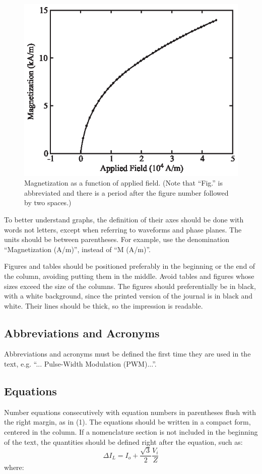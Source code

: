 \documentclass[english]{cobep-spec}
\begin{document}
\begin{figure}[!t]
	\includegraphics[scale=1]{Figs/figure.eps}
	\centering
	\caption{Magnetization as a function of applied field. (Note that ``Fig.'' is abbreviated and there is a period after the figure number followed by two spaces.)}
	\label{fig:fig1}
\end{figure}

To better understand graphs, the definition of their axes should be done with words not letters, except when referring to waveforms and phase planes. The units should be between parentheses. For example, use the denomination ``Magnetization (A/m)'', instead of ``M (A/m)''.

Figures and tables should be positioned preferably in the beginning or the end of the column, avoiding putting them in the middle. Avoid tables and figures whose sizes exceed the size of the columns. The figures should preferentially be in black, with a white background, since the printed version of the journal is in black and white. Their lines should be thick, so the impression is readable.

\subsection{Abbreviations and Acronyms}
Abbreviations and acronyms must be defined the first time they are used in the text, e.g. ``... Pulse-Width Modulation (PWM)...''.

\subsection{Equations}
Number equations consecutively with equation numbers in parentheses flush with the right margin, as in (1). The equations should be written in a compact form, centered in the column. If a nomenclature section is not included in the beginning of the text, the quantities should be defined right after the equation, such as:
\begin{equation}
	\Delta I_{L}=I_{o}+\frac{\sqrt{3}}{2}\frac{V_{i}}{Z}
\end{equation} 
where: 
\end{document}
